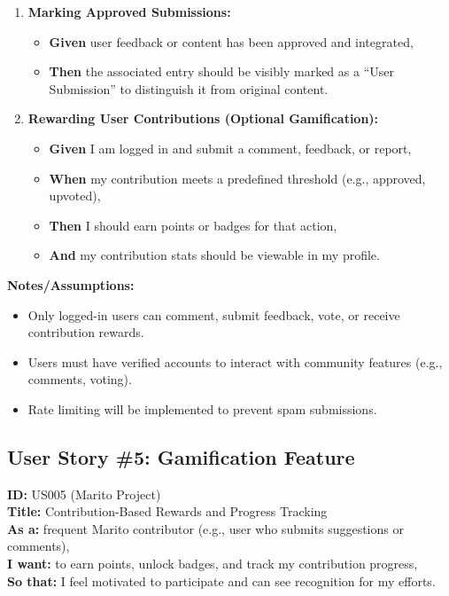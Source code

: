\documentclass[12pt]{article}
\begin{document}
\begin{enumerate}
    \item \textbf{Marking Approved Submissions:}
    \begin{itemize}
        \item \textbf{Given} user feedback or content has been approved and integrated,
        \item \textbf{Then} the associated entry should be visibly marked as a ``User Submission'' to distinguish it from original content.
    \end{itemize}

    \item \textbf{Rewarding User Contributions (Optional Gamification):}
    \begin{itemize}
        \item \textbf{Given} I am logged in and submit a comment, feedback, or report,
        \item \textbf{When} my contribution meets a predefined threshold (e.g., approved, upvoted),
        \item \textbf{Then} I should earn points or badges for that action,
        \item \textbf{And} my contribution stats should be viewable in my profile.
    \end{itemize}
\end{enumerate}

\vspace{1em}
\textbf{Notes/Assumptions:}
\begin{itemize}
    \item Only logged-in users can comment, submit feedback, vote, or receive contribution rewards.
    \item Users must have verified accounts to interact with community features (e.g., comments, voting).
    \item Rate limiting will be implemented to prevent spam submissions.
\end{itemize}

\subsection{User Story \#5: Gamification Feature}

\textbf{ID:} US005 (Marito Project) \\
\textbf{Title:} Contribution-Based Rewards and Progress Tracking \\
\textbf{As a:} frequent Marito contributor (e.g., user who submits suggestions or comments), \\
\textbf{I want:} to earn points, unlock badges, and track my contribution progress, \\
\textbf{So that:} I feel motivated to participate and can see recognition for my efforts.
\end{document}
